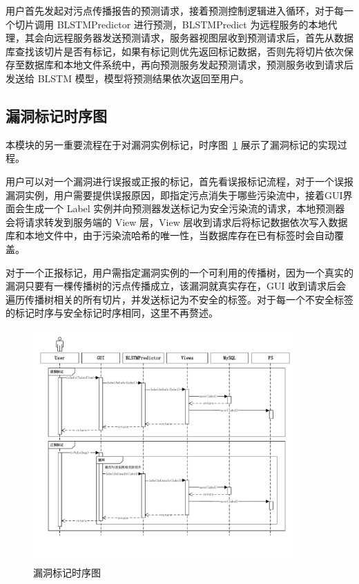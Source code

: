 用户首先发起对污点传播报告的预测请求，接着预测控制逻辑进入循环，对于每一个切片调用 BLSTMPredictor 进行预测，BLSTMPredict 为远程服务的本地代理，其会向远程服务器发送预测请求，服务器视图层收到预测请求后，首先从数据库查找该切片是否有标记，如果有标记则优先返回标记数据，否则先将切片依次保存至数据库和本地文件系统中，再向预测服务发起预测请求，预测服务收到请求后发送给 BLSTM 模型，模型将预测结果依次返回至用户。

\subsection{漏洞标记时序图}

本模块的另一重要流程在于对漏洞实例标记，时序图~\ref{labelTime} 展示了漏洞标记的实现过程。

用户可以对一个漏洞进行误报或正报的标记，首先看误报标记流程，对于一个误报漏洞实例，用户需要提供误报原因，即指定污点消失于哪些污染流中，接着GUI界面会生成一个 Label 实例并向预测器发送标记为安全污染流的请求，本地预测器会将请求转发到服务端的 View 层，View 层收到请求后将标记数据依次写入数据库和本地文件中，由于污染流哈希的唯一性，当数据库存在已有标签时会自动覆盖。

对于一个正报标记，用户需指定漏洞实例的一个可利用的传播树，因为一个真实的漏洞只要有一棵传播树的污点传播成立，该漏洞就真实存在，GUI 收到请求后会遍历传播树相关的所有切片，并发送标记为不安全的标签。对于每一个不安全标签的标记时序与安全标记时序相同，这里不再赘述。


\begin{figure}[htbp]
    \centering
    \includegraphics[width=0.9\textwidth]{FIGs/chapter4/labelTime.pdf}
    \caption{漏洞标记时序图}\label{labelTime}
\end{figure}

